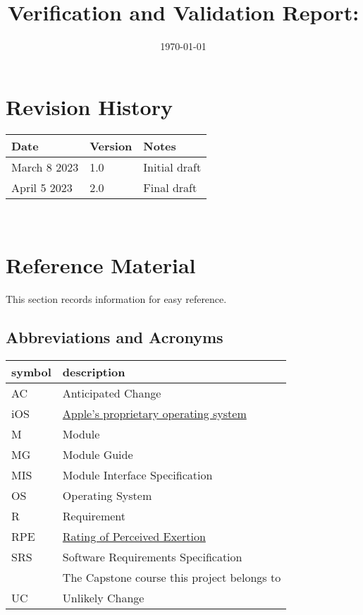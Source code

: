 \documentclass[12pt, titlepage]{article}
\begin{document}
\title{Verification and Validation Report: \progname} 
\author{\authname}
\date{\today}
	
\maketitle


\section{Revision History}

\begin{tabularx}{\textwidth}{p{3cm}p{2cm}X}
\toprule {\bf Date} & {\bf Version} & {\bf Notes}\\
\midrule
March 8 2023 & 1.0 & Initial draft\\
April 5 2023 & 2.0 & Final draft\\
\bottomrule
\end{tabularx}

~\newpage

\section{Reference Material}

This section records information for easy reference.

\subsection{Abbreviations and Acronyms}

\renewcommand{\arraystretch}{1.2}
\begin{tabular}{l l} 
	\toprule		
	\textbf{symbol} & \textbf{description}\\
	\midrule 
	AC & Anticipated Change\\
	iOS & \href{https://en.wikipedia.org/wiki/IOS}{Apple's proprietary operating system} \\
	M & Module \\
	MG & Module Guide \\
	MIS & Module Interface Specification \\
	OS & Operating System \\
	R & Requirement\\
	RPE & \href{https://en.wikipedia.org/wiki/Rating_of_perceived_exertion}{Rating of Perceived Exertion} \\
	SRS & Software Requirements Specification\\
	\progname & The Capstone course this project belongs to \\
	UC & Unlikely Change \\
	\bottomrule
\end{tabular}\\
\end{document}
